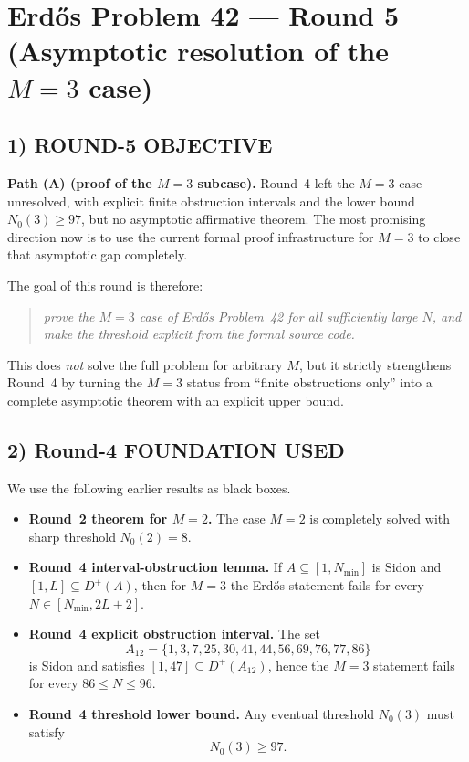 \section{Erd\H{o}s Problem 42 --- Round 5 (Asymptotic resolution of the \(M=3\) case)}

\subsection{1) ROUND-5 OBJECTIVE}
\textbf{Path (A) (proof of the \(M=3\) subcase).}
Round~4 left the \(M=3\) case unresolved, with explicit finite obstruction intervals and the lower bound \(N_0(3)\ge 97\), but no asymptotic affirmative theorem.  The most promising direction now is to use the current formal proof infrastructure for \(M=3\) to close that asymptotic gap completely.

The goal of this round is therefore:
\begin{quote}
\emph{prove the \(M=3\) case of Erd\H{o}s Problem~42 for all sufficiently large \(N\), and make the threshold explicit from the formal source code.}
\end{quote}

This does \emph{not} solve the full problem for arbitrary \(M\), but it strictly strengthens Round~4 by turning the \(M=3\) status from ``finite obstructions only'' into a complete asymptotic theorem with an explicit upper bound.

\subsection{2) Round-4 FOUNDATION USED}
We use the following earlier results as black boxes.

\begin{itemize}
  \item \textbf{Round~2 theorem for \(M=2\).} The case \(M=2\) is completely solved with sharp threshold \(N_0(2)=8\).
  \item \textbf{Round~4 interval-obstruction lemma.} If \(A\subseteq[1,N_{\min}]\) is Sidon and \([1,L]\subseteq D^+(A)\), then for \(M=3\) the Erd\H{o}s statement fails for every \(N\in[N_{\min},2L+2]\).
  \item \textbf{Round~4 explicit obstruction interval.} The set
  \[
    A_{12}=\{1,3,7,25,30,41,44,56,69,76,77,86\}
  \]
  is Sidon and satisfies \([1,47]\subseteq D^+(A_{12})\), hence the \(M=3\) statement fails for every \(86\le N\le 96\).
  \item \textbf{Round~4 threshold lower bound.} Any eventual threshold \(N_0(3)\) must satisfy
  \[
    N_0(3)\ge 97.
  \]
\end{itemize}

